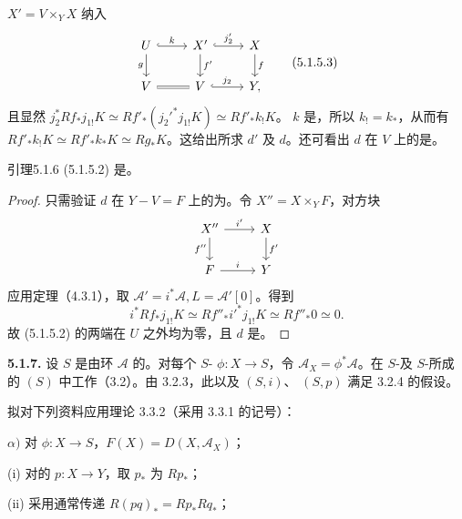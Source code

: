  $X'=V\times_Y X$ 纳入
\[\begin{tikzcd}U\arrow[r,hook,"k"]\arrow[d,"g"']&X'\arrow[r,hook,"j'_2"]\arrow[d,"f'"]&X\arrow[d,"f"]\\V\arrow[r,equal]&V\arrow[r,hook,"j_2"]&Y,\end{tikzcd}\tag{5.1.5.3}\]
且显然 $j_2^*Rf_*j_{1!}K\simeq Rf'_*(j_2'^*j_{1!}K)\simeq Rf'_*k_!K$。
 $k$ 是，所以 $k_!=k_*$，从而有 $Rf'_*k_!K\simeq Rf'_*k_*K\simeq Rg_*K$。这给出所求 $d'$ 及 $d$。还可看出 $d$ 在 $V$ 上的是。
\begin{SGAresult}{引理}{5.1.6}
 (5.1.5.2) 是。
\end{SGAresult}
\begin{proof}
只需验证 $d$ 在 $Y-V=F$ 上的为。令 $X''=X\times_Y F$，对方块
\[\begin{tikzcd}X''\arrow[r,"i'"]\arrow[d,"f''"']&X\arrow[d,"f'"]\\F\arrow[r,"i"]&Y\end{tikzcd}\]
应用定理（4.3.1），取 $\mathscr A'=i^*\mathscr A,L=\mathscr A'[0]$。得到
\[i^*Rf_*j_{1!}K\simeq Rf''_*i'^*j_{1!}K\simeq Rf''_*0\simeq0.\]
故 (5.1.5.2) 的两端在 $U$ 之外均为零，且 $d$ 是。
\end{proof}
\textbf{5.1.7.} 设 $S$ 是由环 $\mathscr A$ 的。对每个 $S$- $\phi:X\to S$，令 $\mathscr A_X=\phi^*\mathscr A$。在 $S$-及 $S$-所成的 $(S)$ 中工作（3.2）。由 3.2.3，此以及 $(S,i)$、 $(S,p)$ 满足 3.2.4 的假设。

拟对下列资料应用理论 3.3.2（采用 3.3.1 的记号）：

$\alpha)$ 对 $\phi:X\to S$，$F(X)=D(X,\mathscr A_X)$；

(i) 对的 $p:X\to Y$，取 $p_*$ 为 $Rp_*$；

(ii) 采用通常传递 $R(pq)_*=Rp_*Rq_*$；

